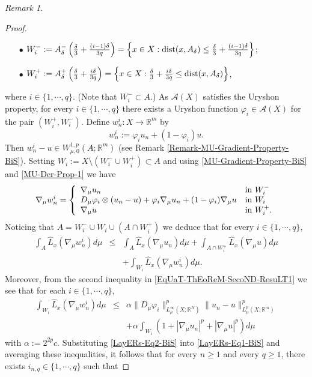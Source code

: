 \documentclass[10pt]{amsart}
\numberwithin{equation}{section}
\theoremstyle{definition}
\theoremstyle{remark}
\newtheorem{remark}[theorem]{Remark}
\begin{document}
\begin{remark}
\begin{proof}
\begin{itemize} 
\item[$\bullet$]$W^-_i:=A^-_\delta\left({\delta\over 3}+{(i-1)\delta\over 3q}\right)=\left\{x\in X:{\rm dist}(x,A_\delta)\leq {\delta\over 3}+{(i-1)\delta\over 3q}\right\}$;
\item[$\bullet$]$W^+_i:=A^+_\delta\left({\delta\over 3}+{i\delta\over 3q}\right)=\left\{x\in X:{\delta\over 3}+{i\delta\over 3q}\leq{\rm dist}(x,A_\delta)\right\}$,
\end{itemize}
where $i\in\{1,\cdots,q\}$. (Note that $W^-_i\subset A$.) As $\mathcal{A}(X)$ satisfies the Uryshon property, for every $i\in\{1,\cdots,q\}$ there exists a Uryshon function $\varphi_i\in\mathcal{A}(X)$ for the pair $(W^+_i,W^-_i)$. Define $w_n^i:X\to{{\mathbb R}}^m$  by 
$$
w^i_n:=\varphi_iu_n+(1-\varphi_i)u.
$$ 
Then $w_n^i-u\in W^{1,p}_{\mu,0}(A;{{\mathbb R}}^m)$ (see Remark \ref{Remark-MU-Gradient-Property-BiS}). Setting $W_i:=X\setminus (W^-_i\cup W^{+}_i)\subset A$ and using \eqref{MU-Gradient-Property-BiS} and \eqref{MU-Der-Prop-1} we have
$$
\nabla_\mu w_n^i=\left\{
\begin{array}{ll}
\nabla_\mu u_n&\hbox{in }W^-_i\\
D_\mu\varphi_i\otimes(u_n-u)+\varphi_i\nabla_\mu u_n+(1-\varphi_i)\nabla_\mu u&\hbox{in }W_i\\
\nabla_\mu u&\hbox{in }W^+_i.
\end{array}
\right.
$$
Noticing that $A=W^-_i\cup W_i\cup(A\cap W^+_i)$ we deduce that for every $i\in\{1,\cdots,q\}$,
\begin{eqnarray}
\int_A\widehat{L}_x(\nabla_\mu w^i_n)d\mu&\leq&\int_A\widehat{L}_x(\nabla_\mu u_n)d\mu+\int_{A\cap W^+_i}\widehat{L}_x(\nabla_\mu u)d\mu\label{LayERs-Eq1-BiS}\\
&&+\int_{W_i}\widehat{L}_x(\nabla_\mu w^i_n)d\mu.\nonumber
\end{eqnarray}
Moreover, from the second inequality in \eqref{EqUaT-ThEoReM-SecoND-ResuLT1} we see that for each $i\in\{1,\cdots,q\}$,
\begin{eqnarray}
\int_{W_i}\widehat{L}_x(\nabla_\mu w^i_n)d\mu&\leq&\alpha\|D_\mu\varphi_i\|^p_{L^\infty_\mu(X;{{\mathbb R}}^N)}\|u_n-u\|^p_{L^p_\mu(X;{{\mathbb R}}^m)}\label{LayERs-Eq2-BiS}\\
&&+\alpha\int_{W_i}(1+|\nabla_\mu u_n|^p+|\nabla_\mu u|^p)d\mu\nonumber
\end{eqnarray}
with $\alpha:=2^{2p}c$. Substituting \eqref{LayERs-Eq2-BiS} into \eqref{LayERs-Eq1-BiS} and averaging these inequalities, it follows that for every $n\geq 1$ and every $q\geq 1$, there exists $i_{n,q}\in\{1,\cdots,q\}$ such that

\end{proof}
\end{remark}
\end{document}
